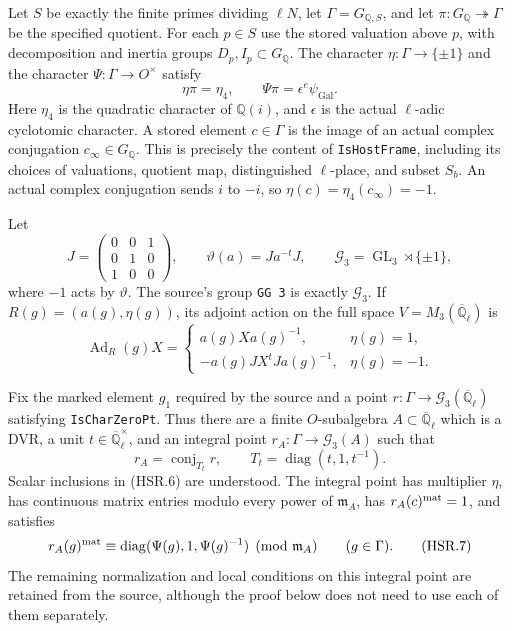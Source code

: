\documentclass[11pt,a4paper]{article}
\numberwithin{equation}{section}
\theoremstyle{remark}\newtheorem{remark}[theorem]{Remark}
\begin{document}
Let $S$ be exactly the finite primes dividing $\ell N$, let
$\Gamma=G_{\mathbb Q,\allowbreak{} S}$, and let
$\pi:G_{\mathbb Q}\twoheadrightarrow\Gamma$ be the specified
quotient.  For each $p\in S$ use the stored valuation above $p$,
with decomposition and inertia groups $D_p,\allowbreak{} I_p\subset G_{\mathbb Q}$.
The character $\eta:\Gamma\to\{\pm1\}$ and the character
$\Psi:\Gamma\to O^\times$ satisfy
\[
 \eta\pi=\eta_4,\qquad
 \Psi\pi=\epsilon^e\psi_{\mathrm{Gal}}.
 \tag{HSR.3}
\]
Here $\eta_4$ is the quadratic character of $\mathbb Q(i)$,
and $\epsilon$ is the actual $\ell$-adic cyclotomic character.
A stored element $c\in\Gamma$ is the image of an actual complex
conjugation $c_\infty\in G_{\mathbb Q}$.  This is precisely the
content of \texttt{Is\allowbreak Host\allowbreak Frame}, including its choices of valuations,
quotient map, distinguished $\ell$-place, and subset $S_b$.
An actual complex conjugation sends $i$ to $-i$, so
$\eta(c)=\eta_4(c_\infty)=-1$.

Let
\[
 J=\begin{pmatrix}0&0&1\\0&1&0\\1&0&0\end{pmatrix},\qquad
 \vartheta(a)=Ja^{-t}J,
 \qquad \mathcal G_3=\operatorname{GL}_3\rtimes\{\pm1\},
 \tag{HSR.4}
\]
where $-1$ acts by $\vartheta$.  The source's group
\texttt{GG 3} is exactly $\mathcal G_3$.  If
$R(g)=(a(g),\eta(g))$, its adjoint action on the full space
$V=M_3(\overline{\mathbb Q}_\ell)$ is
\[
 \operatorname{Ad}_R(g)X=
 \begin{cases}
 a(g)Xa(g)^{-1},&\eta(g)=1,\\
 -a(g)JX^tJa(g)^{-1},&\eta(g)=-1.
 \end{cases}
 \tag{HSR.5}
\]

Fix the marked element $g_1$ required by the source and a point
$r:\Gamma\to\mathcal G_3(\overline{\mathbb Q}_\ell)$ satisfying
\texttt{Is\allowbreak Char\allowbreak Zero\allowbreak Pt}.  Thus there are a finite $O$-subalgebra
$A\subset\overline{\mathbb Q}_\ell$ which is a DVR, a unit
$t\in\overline{\mathbb Q}_\ell^\times$, and an integral point
$r_A:\Gamma\to\mathcal G_3(A)$ such that
\[
 r_A=\operatorname{conj}_{T_t}r,
 \qquad T_t=\operatorname{diag}(t,1,\allowbreak{} t^{-1}).
 \tag{HSR.6}
\]
Scalar inclusions in (HSR.6) are understood.  The integral point has
multiplier $\eta$, has continuous matrix entries modulo every power
of $\mathfrak m_A$, has $r_A(c)^{\rm mat}=1$, and satisfies
\[
 r_A(g)^{\rm mat}\equiv
 \operatorname{diag}(\Psi(g),1,\Psi(g)^{-1})\pmod{\mathfrak m_A}
 \qquad(g\in\Gamma).
 \tag{HSR.7}
\]
The remaining normalization and local conditions on this integral
point are retained from the source, although the proof below does
not need to use each of them separately.
\end{document}
